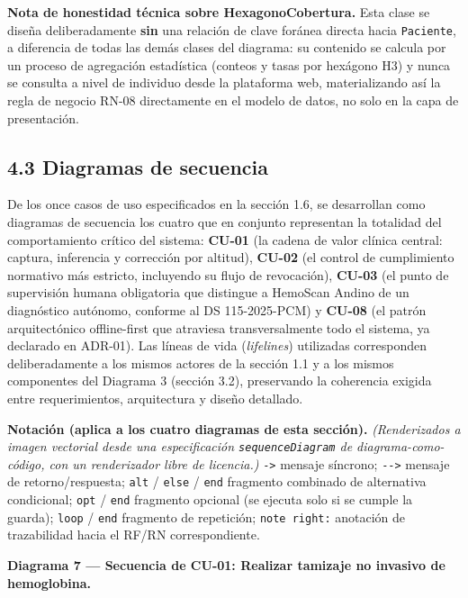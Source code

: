 \documentclass[11pt,a4paper]{article}
\begin{document}
\textbf{Nota de honestidad técnica sobre HexagonoCobertura.} Esta clase se diseña deliberadamente \textbf{sin} una relación de clave foránea directa hacia \texttt{Paciente}, a diferencia de todas las demás clases del diagrama: su contenido se calcula por un proceso de agregación estadística (conteos y tasas por hexágono H3) y nunca se consulta a nivel de individuo desde la plataforma web, materializando así la regla de negocio RN-08 directamente en el modelo de datos, no solo en la capa de presentación.

\subsection{4.3 Diagramas de secuencia}\label{diagramas-de-secuencia}

De los once casos de uso especificados en la sección 1.6, se desarrollan como diagramas de secuencia los cuatro que en conjunto representan la totalidad del comportamiento crítico del sistema: \textbf{CU-01} (la cadena de valor clínica central: captura, inferencia y corrección por altitud), \textbf{CU-02} (el control de cumplimiento normativo más estricto, incluyendo su flujo de revocación), \textbf{CU-03} (el punto de supervisión humana obligatoria que distingue a HemoScan Andino de un diagnóstico autónomo, conforme al DS 115-2025-PCM) y \textbf{CU-08} (el patrón arquitectónico offline-first que atraviesa transversalmente todo el sistema, ya declarado en ADR-01). Las líneas de vida (\emph{lifelines}) utilizadas corresponden deliberadamente a los mismos actores de la sección 1.1 y a los mismos componentes del Diagrama 3 (sección 3.2), preservando la coherencia exigida entre requerimientos, arquitectura y diseño detallado.

\textbf{Notación (aplica a los cuatro diagramas de esta sección).} \emph{(Renderizados a imagen vectorial desde una especificación \texttt{sequenceDiagram} de diagrama-como-código, con un renderizador libre de licencia.)} \texttt{-\textgreater{}} mensaje síncrono; \texttt{-\/-\textgreater{}} mensaje de retorno/respuesta; \texttt{alt} / \texttt{else} / \texttt{end} fragmento combinado de alternativa condicional; \texttt{opt} / \texttt{end} fragmento opcional (se ejecuta solo si se cumple la guarda); \texttt{loop} / \texttt{end} fragmento de repetición; \texttt{note\ right:} anotación de trazabilidad hacia el RF/RN correspondiente.

\textbf{Diagrama 7 --- Secuencia de CU-01: Realizar tamizaje no invasivo de hemoglobina.}
\end{document}

